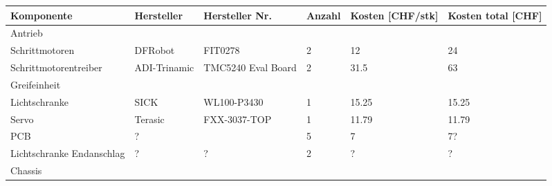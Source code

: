 \documentclass[main.tex]{subfiles} %
\begin{document}
\begin{table}[h]
    \centering
    \scriptsize %
    \begin{tabular}{|p{3cm}|p{3cm}|p{3cm}|p{1cm}|p{1.5cm}|p{1cm}|}
        \hline
        \textbf{Komponente}                    & \textbf{Hersteller}    & \textbf{Hersteller Nr.}          & \textbf{Anzahl}     & \textbf{Kosten [CHF/stk]}  & \textbf{Kosten total [CHF]}     \\ \hline
        \rowcolor{lightgray} Antrieb           &                        &                                 &                     &                            &                                 \\ \hline
        Schrittmotoren                         & DFRobot                & FIT0278                         & 2                   & 12                         & 24                              \\ \hline
        Schrittmotorentreiber                  & ADI-Trinamic           & TMC5240 Eval Board              & 2                   & 31.5                       & 63                              \\ \hline
        \rowcolor{lightgray} Greifeinheit      &                        &                                 &                     &                            &                                 \\ \hline
        Lichtschranke                          & SICK                   & WL100-P3430                     & 1                   & 15.25                      & 15.25                           \\ \hline
        Servo                                  & Terasic                & FXX-3037-TOP                    & 1                   & 11.79                      & 11.79                           \\ \hline
        PCB                                    & ?                      &                                 & 5                   & 7                          & 7?                              \\ \hline
        Lichtschranke Endanschlag              & ?                      & ?                               & 2                   & ?                          & ?                              \\ \hline
        \rowcolor{lightgray} Chassis           &                        &                                 &                     &                            &                                 \\ \hline

\end{tabular}
\end{table}
\end{document}
